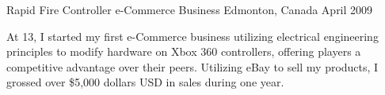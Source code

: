 

\begin{cventries}

  \cventry
    {} %
    {Rapid Fire Controller e-Commerce Business} %
    {Edmonton, Canada} %
    {April 2009} %
    {
      \begin{cvitems} %
        \item {At 13, I started my first e-Commerce business utilizing electrical engineering principles to modify hardware on Xbox 360 controllers, offering players a competitive advantage over their peers. Utilizing eBay to sell my products, I grossed over \$5,000 dollars USD in sales during one year.}
      \end{cvitems}
    }
\end{cventries}
